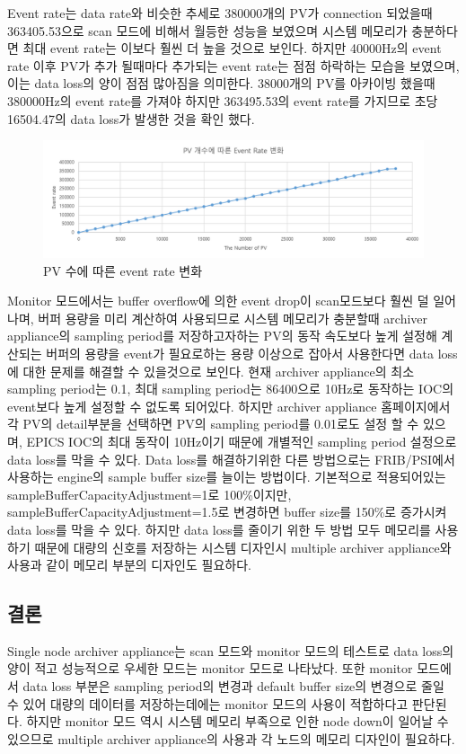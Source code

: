 \documentclass[11pt
  , a4paper
  , article
  , oneside
]{memoir}
\begin{document}
Event rate는 data rate와 비슷한 추세로 380000개의 PV가 connection 되었을때 \\363405.53으로 scan 모드에 비해서 월등한 성능을 보였으며 시스템 메모리가 충분하다면 최대 event rate는 이보다 훨씬 더 높을 것으로 보인다. 하지만 40000Hz의 event rate 이후 PV가 추가 될때마다 추가되는 event rate는 점점 하락하는 모습을 보였으며, 이는 data loss의 양이 점점 많아짐을 의미한다. 38000개의 PV를 아카이빙 했을때 380000Hz의 event rate를 가져야 하지만 363495.53의 event rate를 가지므로 초당 16504.47의 data loss가 발생한 것을 확인 했다. 
\clearpage
\begin{figure}[h!]
	\centering
	\includegraphics[width=1\textwidth, height=0.3\textheight]{./images/event1.png}
	\caption{PV 수에 따른 event rate 변화}
\end{figure}
Monitor 모드에서는 buffer overflow에 의한 event drop이 scan모드보다 훨씬 덜 일어나며, 버퍼 용량을 미리 계산하여 사용되므로 시스템 메모리가 충분할때 archiver appliance의 sampling period를 저장하고자하는 PV의 동작 속도보다 높게 설정해 계산되는 버퍼의 용량을 event가 필요로하는 용량 이상으로 잡아서 사용한다면 data loss에 대한 문제를 해결할 수 있을것으로 보인다. 현재 archiver appliance의 최소 sampling period는 0.1, 최대 sampling period는 86400으로 10Hz로 동작하는 IOC의 event보다 높게 설정할 수 없도록 되어있다. 하지만 archiver appliance 홈페이지에서 각 PV의 detail부분을 선택하면 PV의 sampling period를 0.01로도 설정 할 수 있으며, EPICS IOC의 최대 동작이 10Hz이기 때문에 개별적인 sampling period 설정으로 data loss를 막을 수 있다. Data loss를 해결하기위한 다른 방법으로는 FRIB/PSI에서 사용하는 engine의 sample buffer size를 늘이는 방법이다. 기본적으로 적용되어있는 sampleBufferCapacityAdjustment=1로 100\%이지만, sampleBufferCapacityAdjustment=1.5로 변경하면 buffer size를 150\%로 증가시켜 data loss를 막을 수 있다. 하지만 data loss를 줄이기 위한 두 방법 모두 메모리를 사용하기 때문에 대량의 신호를 저장하는 시스템 디자인시 multiple archiver appliance와 사용과 같이 메모리 부분의 디자인도 필요하다.\\
\subsection{결론}
Single node archiver appliance는 scan 모드와 monitor 모드의 테스트로 data loss의 양이 적고 성능적으로 우세한 모드는 monitor 모드로 나타났다. 또한 monitor 모드에서 data loss 부분은 sampling period의 변경과 default buffer size의 변경으로 줄일 수 있어 대량의 데이터를 저장하는데에는 monitor 모드의 사용이 적합하다고 판단된다. 하지만 monitor 모드 역시 시스템 메모리 부족으로 인한 node down이 일어날 수 있으므로 multiple archiver appliance의 사용과 각 노드의 메모리 디자인이 필요하다.
\end{document}
